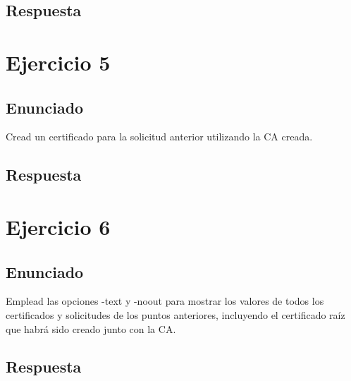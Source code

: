 \documentclass[10pt,a4paper,spanish]{report}
\begin{document}
\section{Respuesta}
\noindent

\chapter{Ejercicio 5}

\section{Enunciado}
\noindent
Cread un certificado para la solicitud anterior utilizando la CA creada.

\section{Respuesta}
\noindent

\chapter{Ejercicio 6}

\section{Enunciado}
\noindent
Emplead las opciones -text y -noout para mostrar los valores de todos los certificados y solicitudes de los puntos anteriores, incluyendo el certificado raíz que habrá sido creado junto con la CA.

\section{Respuesta}
\noindent

\end{document}
